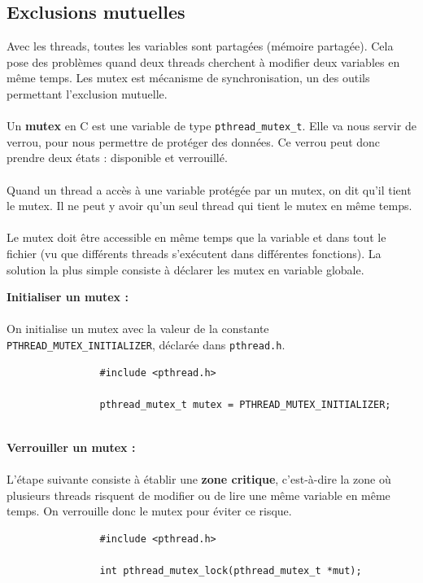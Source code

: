	\subsection{Exclusions mutuelles}
		\begin{frame}[containsverbatim]
			Avec les threads, toutes les variables sont partagées (mémoire partagée). Cela pose des problèmes quand deux threads cherchent à modifier deux variables en même temps. Les mutex est mécanisme de synchronisation, un des outils permettant l'exclusion mutuelle.
			\\~\\
			Un \textbf{mutex} en C est une variable de type \lstinline!pthread_mutex_t!. Elle va nous servir de verrou, pour nous permettre de protéger des données. Ce verrou peut donc prendre deux états : disponible et verrouillé.
			\\~\\
			Quand un thread a accès à une variable protégée par un mutex, on dit qu'il tient le mutex. Il ne peut y avoir qu'un seul thread qui tient le mutex en même temps.
			\\~\\
			Le mutex doit être accessible en même temps que la variable et dans tout le fichier (vu que différents threads s'exécutent dans différentes fonctions). La solution la plus simple consiste à déclarer les mutex en variable globale.
		\end{frame}
		
		\begin{frame}[containsverbatim]
			\textbf{Initialiser un mutex :}
			\\~\\
			On initialise un mutex avec la valeur de la constante \lstinline!PTHREAD_MUTEX_INITIALIZER!, déclarée dans \lstinline!pthread.h!.
			\begin{lstlisting}
				#include <pthread.h>

				pthread_mutex_t mutex = PTHREAD_MUTEX_INITIALIZER;
			\end{lstlisting}
			~\\
			\textbf{Verrouiller un mutex :}
			\\~\\
			L'étape suivante consiste à établir une \textbf{zone critique}, c'est-à-dire la zone où plusieurs threads risquent de modifier ou de lire une même variable en même temps. On verrouille donc le mutex pour éviter ce risque.
			\begin{lstlisting}
				#include <pthread.h>

				int pthread_mutex_lock(pthread_mutex_t *mut);
			\end{lstlisting}
		\end{frame}
		
